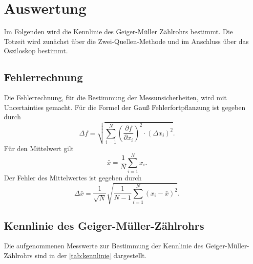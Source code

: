 \section{Auswertung}
\label{sec:auswertung}
Im Folgenden wird die Kennlinie des Geiger-Müller Zählrohrs bestimmt. Die Totzeit wird zunächst über die Zwei-Quellen-Methode
und im Anschluss über das Osziloskop bestimmt.

\subsection{Fehlerrechnung}
\label{sec:Fehlerrechnung}
Die Fehlerrechnung, für die Bestimmung der Messunsicherheiten, wird mit Uncertainties \cite{uncertainties} gemacht.
Für die Formel der Gauß Fehlerfortpflanzung ist gegeben durch
\begin{equation}
    \Delta f=\sqrt{\sum_{i=1}^N\left(\frac{\partial f}{\partial x_i}\right)^2 \cdot\left(\Delta x_i\right)^2}.
    \label{eqn:gauss}
\end{equation}
Für den Mittelwert gilt 
\begin{equation}
    \bar{x} = \frac{1}{N}\sum\limits_{i = 1}^N x_i .
    \label{eqn:mittelwert}
\end{equation}
Der Fehler des Mittelwertes ist gegeben durch 
\begin{equation}
    \Delta \bar{x}=\frac{1}{\sqrt{N}} \sqrt{\frac{1}{N-1} \sum_{i=1}^N\left(x_i-\bar{x}\right)^2}.
    \label{eqn:mittelwertfehler}
\end{equation}

\subsection{Kennlinie des Geiger-Müller-Zählrohrs}
\label{sec:Kennlinie des Geiger-Müller-Zählrohrs}

Die aufgenommenen Messwerte zur Bestimmung der Kennlinie des Geiger-Müller-Zählrohrs sind in der \autoref{tab:kennlinie}
dargestellt.

